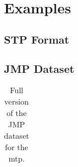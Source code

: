 \chapter{Examples}
\label{chap:app:examples}

\section{STP Format}



\section{JMP Dataset}
\centering
\begin{table}[h!]\centering
\begin{tabular}[h!]{c|c|c}
  
\end{tabular}
\caption{Full version of the JMP dataset for the \gls{mtp}.}\label{tab:app:jmp}
\end{table}
